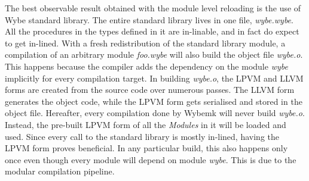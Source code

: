 The best observable result obtained with the module level reloading is the use
of Wybe standard library. The entire standard library lives in one file,
\textit{wybe.wybe}. All the procedures in the types defined in it are
in-linable, and in fact do expect to get in-lined. With a fresh redistribution
of the standard library module, a compilation of an arbitrary module
\textit{foo.wybe} will also build the object file \textit{wybe.o}. This happens
because the compiler adds the dependency on the module \textit{wybe} implicitly
for every compilation target. In building \textit{wybe.o}, the LPVM and LLVM
forms are created from the source code over numerous passes. The LLVM form
generates the object code, while the LPVM form gets serialised and stored in
the object file. Hereafter, every compilation done by Wybemk will never build
\textit{wybe.o}. Instead, the pre-built LPVM form of all the \textit{Modules}
in it will be loaded and used. Since every call to the standard library is
mostly in-lined, having the LPVM form proves beneficial. In any particular
build, this also happens only once even though every module will depend on
module \textit{wybe}. This is due to the modular compilation pipeline.









